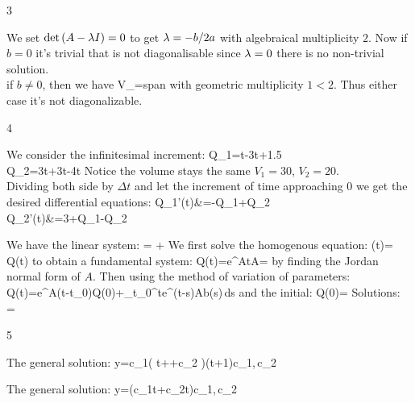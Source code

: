 \begin{vv286_mp}{3}
\item[]
	We set $\det\left( A-\lambda I \right)=0$ to get $\lambda=-b/2a$ with algebraical multiplicity
	$2$. Now if $b=0$ it's trivial that 
	\eq
	{
	}
	is not diagonalisable since $\lambda=0$ there is no non-trivial solution.\\
	if $b\neq 0$, then we have 
	\eq
	{
	V_{\lam}={\rm span}
	}
	with geometric multiplicity $1<2$. Thus either case it's not  diagonalizable. 
\end{vv286_mp}
\begin{vv286_ms}{4}
\item[(i)]
	We consider the infinitesimal increment:
	\eq
	{
	\Delta Q_1=\Delta t-3\Delta t+1.5\\
	\Delta Q_2=3\Delta t+3\Delta t-4\Delta t
	}
	Notice the volume stays the same $V_1=30$, $V_2=20$.\\
	Dividing both side by $\Delta t$ and let the increment of time approaching $0$ we get the
	desired differential equations:
	\eq
	{
	Q_1'(t)&=-Q_1+Q_2\\
	Q_2'(t)&=3+Q_1-Q_2
	}
\item[(ii)]
	We have the linear system:
	\eq
	{
	=
		+
	}
	We first solve the homogenous equation:
	\eq
	{
	(t)=
				Q(t)
	}
	to obtain a fundamental system:
	\eq
	{
	Q(t)=e^{At}\quad A=
	}
	by finding the Jordan normal form of $A$.
	Then using the method of variation of parameters:
	\eq
	{
	Q(t)=e^{A(t-t_0)}Q(0)+\int_{t_0}^{t}e^{(t-s)A}b(s)\,ds
	}
	and the initial:
	\eq
	{
	Q(0)=
	}
	Solutions:
	\eq
	{
	=
	}
\end{vv286_ms}
\begin{vv286_ms}{5}
\item[(i)]
	The general solution:
	\eq
	{
	y=c_1\left( t++c_2 \right)(t+1)\quad c_1,\,c_2\in\R
	}
\item[(ii)]
	The general solution:
	\eq
	{
	y=(c_1\sin t+c_2\cos t)\quad c_1,\,c_2\in\R
	}
\end{vv286_ms}
